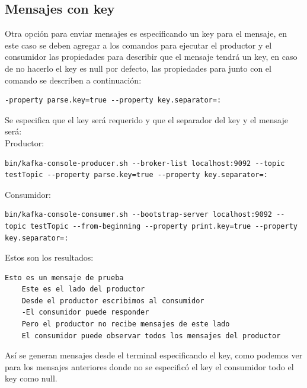 \documentclass{article}
\begin{document}
\subsection{Mensajes con key}
Otra opción para enviar mensajes es especificando un key para el mensaje, en este caso se deben agregar a los comandos para ejecutar el productor y el consumidor las propiedades para describir que el mensaje tendrá un key, en caso de no hacerlo el key es null por defecto, las propiedades para junto con el comando se describen a continuación:
\begin{lstlisting}[numbers=none]
    -property parse.key=true --property key.separator=:\end{lstlisting}
Se especifica que el key será requerido y que el separador del key y el mensaje será:\\
Productor:
\begin{lstlisting}[numbers=none]
    bin/kafka-console-producer.sh --broker-list localhost:9092 --topic testTopic --property parse.key=true --property key.separator=:\end{lstlisting}
Consumidor:\\
    \begin{lstlisting}[numbers=none]
    bin/kafka-console-consumer.sh --bootstrap-server localhost:9092 --topic testTopic --from-beginning --property print.key=true --property key.separator=:\end{lstlisting}
Estos son los resultados:
\begin{lstlisting}[numbers=none]
    Esto es un mensaje de prueba
    Este es el lado del productor
    Desde el productor escribimos al consumidor
    -El consumidor puede responder
    Pero el productor no recibe mensajes de este lado
    El consumidor puede observar todos los mensajes del productor\end{lstlisting}
Así se generan mensajes desde el terminal especificando el key, como podemos ver para los mensajes anteriores donde no se especificó el key el consumidor todo el key como null.
\end{document}
